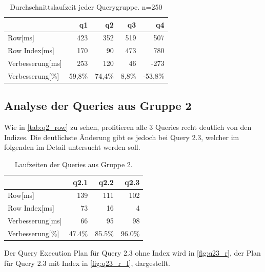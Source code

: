\begin{table}[H]
    \begin{tabularx}{\linewidth}{lrrrr}
        \toprule
                            &   q1          &   q2      &	q3      & q4          \\
        \toprule
        Row[ms]	            &	423	        &	352	    &	519	    & 507	      \\
        Row Index[ms]       &   170         &   90	    &   473	    & 780	      \\
        Verbesserung[ms]    &   253         &   120     &   46      & -273        \\
        Verbesserung[\%]    &   59,8\%      &   74,4\%  &   8,8\%   & -53,8\%     \\    
\bottomrule
\end{tabularx}
\caption{Durchschnittslaufzeit jeder Querygruppe. n=250}
\label{tab:basic_index_row_q}
\end{table}



\subsection{Analyse der Queries aus Gruppe 2}

Wie in \autoref{tab:q2_row} zu sehen, profitieren alle 3 Queries recht deutlich von den Indizes. 
Die deutlichste Änderung gibt es jedoch bei Query 2.3, welcher im folgenden im Detail untersucht werden soll.

\setlength\intextsep{0pt}
\begin{table}[H]
    \begin{tabularx}{\linewidth}{lrrr}
        \toprule
                        & q2.1  &	q2.2    &	q2.3 \\
        \toprule
        Row[ms]	        & 139	&	111	    &	102  \\
        Row Index[ms]   & 73	&   16	    &   4    \\
        Verbesserung[ms]  & 66    &   95      &   98   \\
        Verbesserung[\%]  & 47.4\%  &   85.5\%    &   96.0\% \\    
\bottomrule
\end{tabularx}
\caption{Laufzeiten der Queries aus Gruppe 2.}
\label{tab:q2_row}
\end{table}

Der Query Execution Plan für Query 2.3 ohne Index wird in \autoref{fig:q23_r}, der Plan für Query 2.3 mit Index in \autoref{fig:q23_r_I}, dargestellt.

